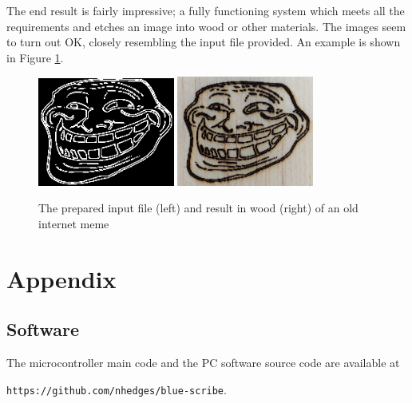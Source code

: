 \documentclass[11pt]{LaTeX-Classes/math-hw}
\begin{document}
The end result is fairly impressive; a fully functioning system which meets all the requirements
and etches an image into wood or other materials.
The images seem to turn out OK, closely resembling the input file provided.
An example is shown in Figure \ref{fig:troll-print}.
\begin{figure}[H]
  \begin{center}
    \includegraphics[width=0.4\textwidth]{trollface-edges}
    \includegraphics[width=0.4\textwidth]{trollface-result}
    \caption{The prepared input file (left) and result in wood (right) of an old internet meme}
    \label{fig:troll-print}
  \end{center}
\end{figure}



\section*{Appendix}
\subsection*{Software}
The microcontroller main code and the PC software source code
are available at

\texttt{https://github.com/nhedges/blue-scribe}.
\end{document}
